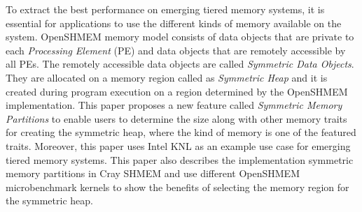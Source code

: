 To extract the best performance on emerging tiered memory systems,
it is essential for applications to use the different kinds of
memory available on the system. OpenSHMEM memory model consists of
data objects that are private to each \emph{Processing Element}
(PE) and data objects that are remotely accessible by all PEs. The
remotely accessible data objects are called \emph{Symmetric Data
Objects}. They are allocated on a memory region called as
\emph{Symmetric Heap} and it is created during program execution
on a region determined by the OpenSHMEM implementation. This paper
proposes a new feature called \emph{Symmetric Memory Partitions} to
enable users to determine the size along with other memory traits
for creating the symmetric heap, where the kind of memory is one of
the featured traits. Moreover, this paper uses Intel KNL as an
example use case for emerging tiered memory systems. This paper also
describes the implementation symmetric memory partitions in
Cray SHMEM and use different OpenSHMEM microbenchmark kernels to
show the benefits of selecting the memory region for the symmetric
heap.

